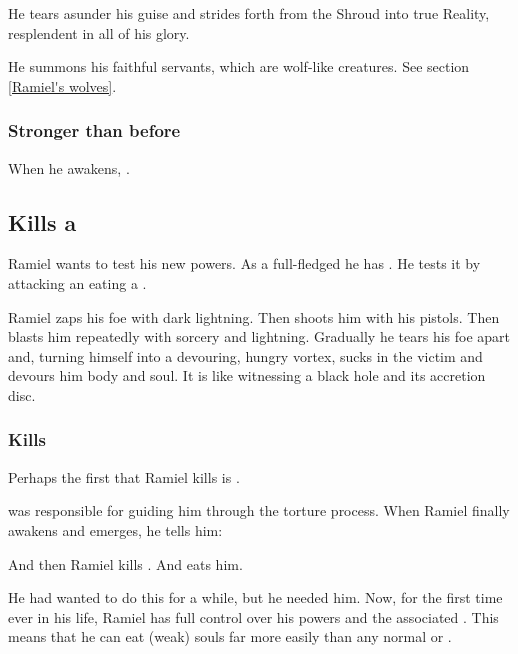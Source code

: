 He tears asunder his \human{} guise and strides forth from the Shroud into true Reality, resplendent in all of his \sathariah{} glory. 

He summons his faithful servants, which are wolf-like creatures. See section \ref{Ramiel's wolves}. 





\subsubsection{Stronger than before}
When he awakens, . 










\subsection{Kills a \resphan}
Ramiel wants to test his new powers. 
As a full-fledged \malach he has . 
He tests it by attacking an eating a \resphan. 

Ramiel zaps his foe with dark lightning. 
Then shoots him with his pistols.
Then blasts him repeatedly with sorcery and lightning.
Gradually he tears his foe apart and, turning himself into a devouring, hungry vortex, sucks in the victim and devours him body and soul.
It is like witnessing a black hole and its accretion disc.





\subsubsection{Kills \Gilchad}
Perhaps the first \resphan that Ramiel kills is \Gilchad. 

\Gilchad{} was responsible for guiding him through the torture process. 
When Ramiel finally awakens and emerges, he tells him: 

And then Ramiel kills \Gilchad. 
And eats him. 

He had wanted to do this for a while, but he needed him. 
Now, for the first time ever in his life, Ramiel has full control over his \Malach{} powers and the associated \carcer. 
This means that he can eat (weak) souls far more easily than any normal \resphan{} or \dragon. 

